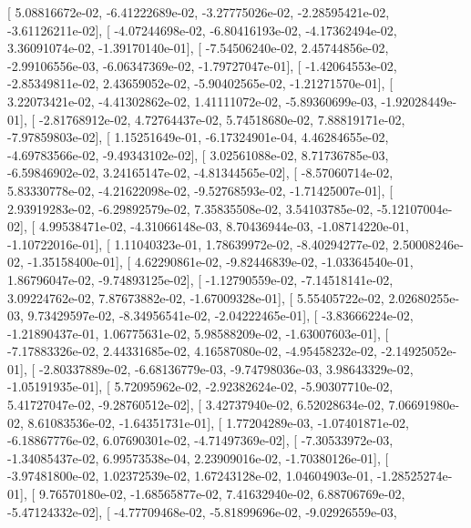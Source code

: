 \documentclass{article}
\begin{document}
       [  5.08816672e-02,  -6.41222689e-02,  -3.27775026e-02,
         -2.28595421e-02,  -3.61126211e-02],
       [ -4.07244698e-02,  -6.80416193e-02,  -4.17362494e-02,
          3.36091074e-02,  -1.39170140e-01],
       [ -7.54506240e-02,   2.45744856e-02,  -2.99106556e-03,
         -6.06347369e-02,  -1.79727047e-01],
       [ -1.42064553e-02,  -2.85349811e-02,   2.43659052e-02,
         -5.90402565e-02,  -1.21271570e-01],
       [  3.22073421e-02,  -4.41302862e-02,   1.41111072e-02,
         -5.89360699e-03,  -1.92028449e-01],
       [ -2.81768912e-02,   4.72764437e-02,   5.74518680e-02,
          7.88819171e-02,  -7.97859803e-02],
       [  1.15251649e-01,  -6.17324901e-04,   4.46284655e-02,
         -4.69783566e-02,  -9.49343102e-02],
       [  3.02561088e-02,   8.71736785e-03,  -6.59846902e-02,
          3.24165147e-02,  -4.81344565e-02],
       [ -8.57060714e-02,   5.83330778e-02,  -4.21622098e-02,
         -9.52768593e-02,  -1.71425007e-01],
       [  2.93919283e-02,  -6.29892579e-02,   7.35835508e-02,
          3.54103785e-02,  -5.12107004e-02],
       [  4.99538471e-02,  -4.31066148e-03,   8.70436944e-03,
         -1.08714220e-01,  -1.10722016e-01],
       [  1.11040323e-01,   1.78639972e-02,  -8.40294277e-02,
          2.50008246e-02,  -1.35158400e-01],
       [  4.62290861e-02,  -9.82446839e-02,  -1.03364540e-01,
          1.86796047e-02,  -9.74893125e-02],
       [ -1.12790559e-02,  -7.14518141e-02,   3.09224762e-02,
          7.87673882e-02,  -1.67009328e-01],
       [  5.55405722e-02,   2.02680255e-03,   9.73429597e-02,
         -8.34956541e-02,  -2.04222465e-01],
       [ -3.83666224e-02,  -1.21890437e-01,   1.06775631e-02,
          5.98588209e-02,  -1.63007603e-01],
       [ -7.17883326e-02,   2.44331685e-02,   4.16587080e-02,
         -4.95458232e-02,  -2.14925052e-01],
       [ -2.80337889e-02,  -6.68136779e-03,  -9.74798036e-03,
          3.98643329e-02,  -1.05191935e-01],
       [  5.72095962e-02,  -2.92382624e-02,  -5.90307710e-02,
          5.41727047e-02,  -9.28760512e-02],
       [  3.42737940e-02,   6.52028634e-02,   7.06691980e-02,
          8.61083536e-02,  -1.64351731e-01],
       [  1.77204289e-03,  -1.07401871e-02,  -6.18867776e-02,
          6.07690301e-02,  -4.71497369e-02],
       [ -7.30533972e-03,  -1.34085437e-02,   6.99573538e-04,
          2.23909016e-02,  -1.70380126e-01],
       [ -3.97481800e-02,   1.02372539e-02,   1.67243128e-02,
          1.04604903e-01,  -1.28525274e-01],
       [  9.76570180e-02,  -1.68565877e-02,   7.41632940e-02,
          6.88706769e-02,  -5.47124332e-02],
       [ -4.77709468e-02,  -5.81899696e-02,  -9.02926559e-03,
\end{document}
